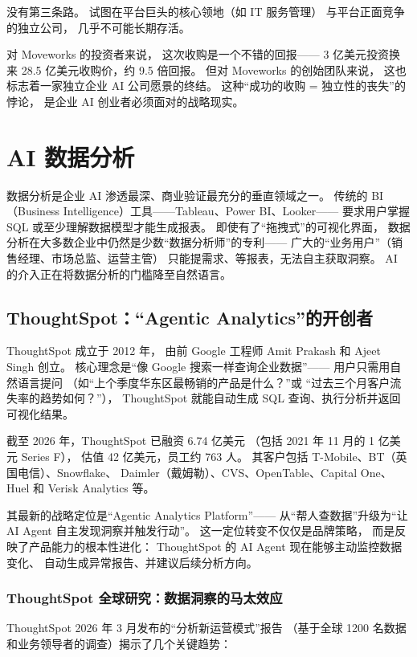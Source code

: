 没有第三条路。
试图在平台巨头的核心领地（如 IT 服务管理）
与平台正面竞争的独立公司，
几乎不可能长期存活。

对 Moveworks 的投资者来说，
这次收购是一个不错的回报——
3 亿美元投资换来 28.5 亿美元收购价，约 9.5 倍回报。
但对 Moveworks 的创始团队来说，
这也标志着一家独立企业 AI 公司愿景的终结。
这种``成功的收购 = 独立性的丧失''的悖论，
是企业 AI 创业者必须面对的战略现实。


\section{AI 数据分析}
\label{sec:ent-analytics}

数据分析是企业 AI 渗透最深、商业验证最充分的垂直领域之一。
传统的 BI（Business Intelligence）工具——Tableau、Power BI、Looker——
要求用户掌握 SQL 或至少理解数据模型才能生成报表。
即使有了``拖拽式''的可视化界面，
数据分析在大多数企业中仍然是少数``数据分析师''的专利——
广大的``业务用户''（销售经理、市场总监、运营主管）
只能提需求、等报表，无法自主获取洞察。
AI 的介入正在将数据分析的门槛降至自然语言。

\subsection{ThoughtSpot：``Agentic Analytics''的开创者}

ThoughtSpot 成立于 2012 年，
由前 Google 工程师 Amit Prakash 和 Ajeet Singh 创立。
核心理念是``像 Google 搜索一样查询企业数据''——
用户只需用自然语言提问
（如``上个季度华东区最畅销的产品是什么？''或
``过去三个月客户流失率的趋势如何？''），
ThoughtSpot 就能自动生成 SQL 查询、执行分析并返回可视化结果。

截至 2026 年，ThoughtSpot 已融资 6.74 亿美元
（包括 2021 年 11 月的 1 亿美元 Series F），
估值 42 亿美元，员工约 763 人。
其客户包括 T-Mobile、BT（英国电信）、Snowflake、
Daimler（戴姆勒）、CVS、OpenTable、Capital One、
Huel 和 Verisk Analytics 等。

其最新的战略定位是``Agentic Analytics Platform''——
从``帮人查数据''升级为``让 AI Agent 自主发现洞察并触发行动''。
这一定位转变不仅仅是品牌策略，
而是反映了产品能力的根本性进化：
ThoughtSpot 的 AI Agent 现在能够主动监控数据变化、
自动生成异常报告、并建议后续分析方向。

\subsubsection{ThoughtSpot 全球研究：数据洞察的马太效应}
ThoughtSpot 2026 年 3 月发布的``分析新运营模式''报告
（基于全球 1200 名数据和业务领导者的调查）揭示了几个关键趋势：


